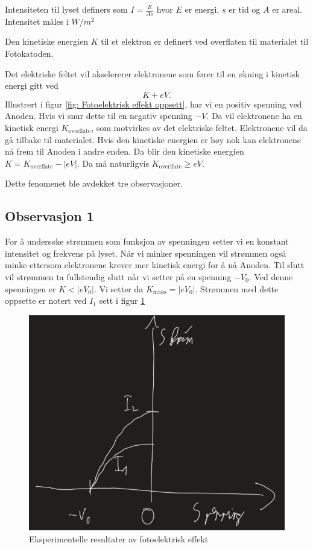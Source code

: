 Intensiteten til lyset definers som $I = \frac{E}{As}$ hvor $E$ er energi, $s$ er tid og $A$ er areal. Intensitet måles i $W / m^{2}$

Den kinetiske energien $K$ til et elektron er definert ved overflaten til materialet til Fotokatoden. 

Det elektriske feltet vil akselererer elektronene som fører til en økning i kinetisk energi gitt ved 
\[
K + eV. 
\]
Illustrert i figur \ref{fig: Fotoelektrisk effekt oppsett}, har vi en positiv spenning ved Anoden. Hvis vi snur dette til en negativ spenning $-V$. Da vil elektronene ha en kinetisk energi $K_{\text{overflate}}$, som motvirkes av det elektriske feltet. Elektronene vil da gå tilbake til materialet. Hvis den kinetiske energien er høy nok kan elektronene nå frem til Anoden i andre enden. Da blir den kinetiske energien $K = K_{\text{overflate}} - \left\vert eV \right\vert $. Da må naturligvis $K_{\text{overlfate}} \ge  eV$. 

Dette fenomenet ble avdekket tre observasjoner. 

\subsection{Observasjon 1}
For å undersøke strømmen som funksjon av spenningen setter vi en konstant intensitet og frekvens på lyset. Når vi minker spenningen vil strømmen også minke ettersom elektronene krever mer kinetisk energi for å nå Anoden. Til slutt vil strømmen ta fullstendig slutt når vi setter på en spenning $-V_0$. Ved denne spenningen er $K < \left\vert eV_0 \right\vert $. Vi setter da $K_{\text{maks}} = \left\vert eV_0 \right\vert $. Strømmen med dette oppsette er notert ved $I_1$ sett i figur \ref{fig: Fotoelektrisk resultat}

\begin{figure}[h!]
  \centering
  \includegraphics[scale = .4]{Figures/Fotoelektrisk resultat.png}
  \caption{Eksperimentelle resultater av fotoelektrisk effekt}
  \label{fig: Fotoelektrisk resultat}
\end{figure}


